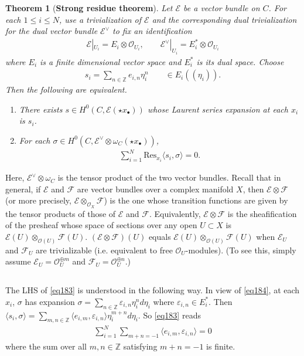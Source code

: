 \documentclass[11pt,b5paper,notitlepage]{article}
\theoremstyle{definition}
\theoremstyle{plain}
\newtheorem{thm}[df]{Theorem}
\newcommand{\Res}{\mathrm{Res}}
\newcommand{\bk}[1]{\langle {#1}\rangle}
\newcommand{\scr}{\mathscr}
\newcommand{\blt}{\bullet}
\newcommand{\Zbb}{\mathbb Z}
\numberwithin{equation}{section}
\begin{document}
\begin{thm}[\textbf{Strong residue theorem}]\label{lb104}
Let $\scr E$ be a vector bundle on $C$. For each $1\leq i\leq N$, use a trivialization of $\scr E$ and the corresponding dual trivialization for the dual vector bundle $\scr E^\vee$ to fix an identification
\begin{align}
\scr E|_{U_i}=E_i\otimes\scr O_{U_i},\qquad \scr E^\vee|_{U_i}=E_i^*\otimes\scr O_{U_i}\label{eq184}
\end{align}
where $E_i$ is a finite dimensional vector space and $E_i^*$ is its dual space. Choose
\begin{align}
s_i=\sum_{n\in\Zbb} e_{i,n}\eta_i^n\qquad\in E_i((\eta_i)). \label{eq185}
\end{align}
Then the following are equivalent.
\begin{enumerate}[label=(\alph*)]
\item There exists $s\in H^0(C,\scr E(\star x_\blt))$ whose Laurent series expansion at each $x_i$ is $s_i$.
\item For each $\sigma\in H^0(C,\scr E^\vee\otimes\omega_C(\star x_{\blt}))$,
\begin{align}
\sum_{i=1}^N \Res_{x_i}\bk{s_i,\sigma}=0. \label{eq183}
\end{align}
\end{enumerate}
\end{thm}
Here, $\scr E^\vee\otimes\omega_C$ is the tensor product of the two vector bundles. Recall that in general, if $\scr E$ and $\scr F$ are vector bundles over a complex manifold $X$, then $\scr E\otimes\scr F$ (or more precisely, $\scr E\otimes_{\scr O_X}\scr F$) is the one whose transition functions are given by the tensor products of those of $\scr E$ and $\scr F$. Equivalently, $\scr E\otimes\scr F$ is the sheafification of the presheaf whose space of sections over any open $U\subset X$ is $\scr E(U)\otimes_{\scr O(U)}\scr F(U)$. $(\scr E\otimes\scr F)(U)$ equals $\scr E(U)\otimes_{\scr O(U)}\scr F(U)$ when $\scr E_U$ and $\scr F_U$ are trivializable (i.e. equivalent to free $\scr O_U$-modules). (To see this, simply assume $\scr E_U=\scr O_U^{\oplus m}$ and $\scr F_U=\scr O_U^{\oplus n}$.)


\subsection{}


The LHS of \eqref{eq183} is understood in the following way. In view of \eqref{eq184}, at each $x_i$, $\sigma$ has expansion $\sigma=\sum_{n\in\Zbb}\varepsilon_{i,n} \eta_i^nd\eta_i$ where $\varepsilon_{i,n}\in E_i^*$. Then $\bk{s_i,\sigma}=\sum_{m,n\in\Zbb}\bk{e_{i,m},\varepsilon_{i,n}}\eta_i^{m+n}d\eta_i$. So \eqref{eq183} reads
\begin{align*}
\sum_{i=1}^N\sum_{m+n=-1}\bk{e_{i,m},\varepsilon_{i,n}}=0
\end{align*}
where the sum over all  $m,n\in\Zbb$ satisfying $m+n=-1$ is finite. 
\end{document}
